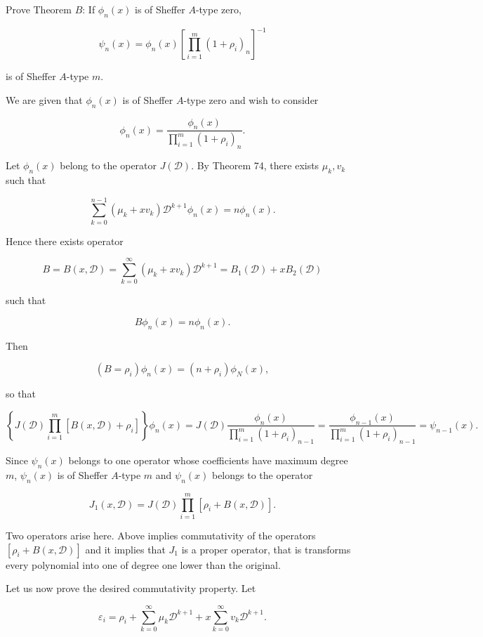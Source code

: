 \begin{problem}\label{problem2chapter13}
Prove Theorem $B$: If $\phi_n(x)$ is of Sheffer $A$-type zero,

$$\psi_n(x) = \phi_n(x) \left[ \displaystyle\prod_{i=1}^m (1+\rho_i)_n \right]^{-1}$$

is of Sheffer $A$-type $m$.
\end{problem}
\begin{solution}
We are given that $\phi_n(x)$ is of Sheffer $A$-type zero and wish to consider

$$\phi_n(x) = \dfrac{\phi_n(x)}{\displaystyle\prod_{i=1}^m (1 + \rho_i)_n}.$$

Let $\phi_n(x)$ belong to the operator $J(\mathscr{D})$. By Theorem 74, there exists $\mu_k, v_k$ such that

$$\displaystyle\sum_{k=0}^{n-1} (\mu_k+x v_k) \mathscr{D}^{k+1} \phi_n(x) = n \phi_n(x).$$

Hence there exists operator

$$B= B(x, \mathscr{D}) = \displaystyle\sum_{k=0}^{\infty} (\mu_k + x v_k) \mathscr{D}^{k+1} = B_1(\mathscr{D}) + x B_2(\mathscr{D})$$

such that

$$B\phi_n(x) = n \phi_n(x).$$

Then

$$(B = \rho_i) \phi_n(x) = (n + \rho_i) \phi_N(x),$$

so that

$$\left\{ J(\mathscr{D}) \displaystyle\prod_{i=1}^m [B(x, \mathscr{D})+\rho_i] \right\} \phi_n(x) = J(\mathscr{D}) \dfrac{\phi_n(x)}{\displaystyle\prod_{i=1}^m (1 + \rho_i)_{n-1}} = \dfrac{\phi_{n-1}(x)}{\displaystyle\prod_{i=1}^m (1 + \rho_i)_{n-1}} = \psi_{n-1}(x).$$

Since $\psi_n(x)$ belongs to one operator whose coefficients have maximum degree $m$, $\psi_n(x)$ is of Sheffer $A$-type $m$ and $\psi_n(x)$ belongs to the operator

$$J_1(x, \mathscr{D}) = J(\mathscr{D}) \displaystyle\prod_{i=1}^m [\rho_i + B(x,\mathscr{D})].$$

Two operators arise here. Above implies commutativity of the operators $[\rho_i + B(x,\mathscr{D})]$ and it implies that $J_1$ is a proper operator, that is transforms every polynomial into one of degree one lower than the original.

Let us now prove the desired commutativity property. Let 

$$\varepsilon_i = \rho_i + \displaystyle\sum_{k=0}^{\infty} \mu_k \mathscr{D}^{k+1} + x \displaystyle\sum_{k=0}^{\infty} v_k \mathscr{D}^{k+1}.$$


\end{solution}
